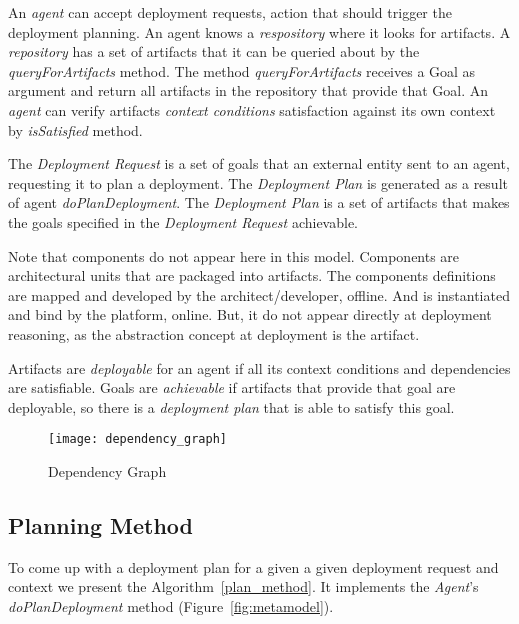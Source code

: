An \emph{agent} can accept deployment requests, action that should trigger the deployment planning. An agent knows a \emph{respository} where it looks for artifacts.
A \emph{repository} has a set of artifacts that it can be queried about by the \emph{queryForArtifacts} method. The method \emph{queryForArtifacts} receives a Goal as argument and return all artifacts in the repository that provide that Goal. An \emph{agent} can verify artifacts \emph{context conditions} satisfaction against its own context by \emph{isSatisfied} method.

The \emph{Deployment Request} is a set of goals that an external entity sent to an agent, requesting it to plan a deployment. The \emph{Deployment Plan} is generated as a result of agent \emph{doPlanDeployment}. The \emph{Deployment Plan} is a set of artifacts that makes the goals specified in the \emph{Deployment Request} achievable.

Note that components do not appear here in this model. Components are architectural units that are packaged into artifacts. The components definitions are mapped and developed by the architect/developer, offline.  And is instantiated and bind by the platform, online. But, it do not appear directly at deployment reasoning, as the abstraction concept at deployment is the artifact.

Artifacts are \emph{deployable} for an agent if all its context conditions and dependencies are satisfiable.
Goals are \emph{achievable} if artifacts that provide that goal are deployable, so there is a \emph{deployment plan} that is able to satisfy this goal.

\begin{figure}[!htb]
  \centering
  \texttt{[image: dependency\_graph]}
  \caption{Dependency Graph}
  \label{fig:dependency_graph}
\end{figure}


\subsection{Planning Method}

To come up with a deployment plan for a given a given deployment request and context we present the Algorithm~\ref{plan_method}. It implements the \emph{Agent}'s \emph{doPlanDeployment} method (Figure~\ref{fig:metamodel}).

